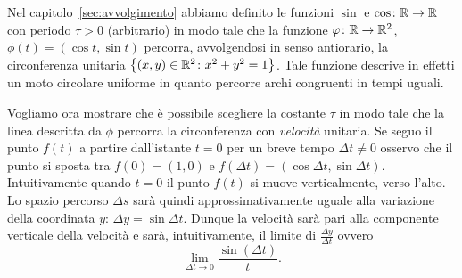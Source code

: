 Nel capitolo~\ref{sec:avvolgimento} abbiamo definito le 
funzioni $\sin$ e $\cos\colon {\mathbb R}\to {\mathbb R}$ con periodo $\tau>0$ (arbitrario)
in modo tale che la funzione $\varphi\colon {\mathbb R}\to{\mathbb R}^2$, $\phi(t)=(\cos t, \sin t)$ 
percorra, avvolgendosi in senso antiorario, la circonferenza 
unitaria ${\left\{ (x,y)\in {\mathbb R}^2\colon x^2+y^2=1 \right\}}$.
Tale funzione descrive in effetti un moto circolare uniforme 
in quanto percorre archi congruenti in tempi uguali.

Vogliamo ora mostrare che è possibile scegliere la costante $\tau$
in modo tale che la linea descritta da $\phi$ percorra la circonferenza 
con \emph{velocità} unitaria.
%
Se seguo il punto $f(t)$ a partire dall'istante $t=0$ per un breve tempo 
$\Delta t\neq 0$
osservo che il punto si sposta tra $f(0) = (1,0)$ e 
$f(\Delta t) = (\cos \Delta t, \sin \Delta t)$.
%
Intuitivamente quando $t=0$ il punto $f(t)$ si muove verticalmente, 
verso l'alto. 
Lo spazio percorso $\Delta s$ sarà quindi approssimativamente 
uguale alla variazione della coordinata $y$: 
$\Delta y = \sin \Delta t$.
Dunque la velocità sarà pari alla componente verticale della velocità 
e sarà, intuitivamente, il limite di $\frac{\Delta y}{\Delta t}$ ovvero 
\[
\lim_{\Delta t\to 0} \frac{\sin(\Delta t)}{t}.  
\]

